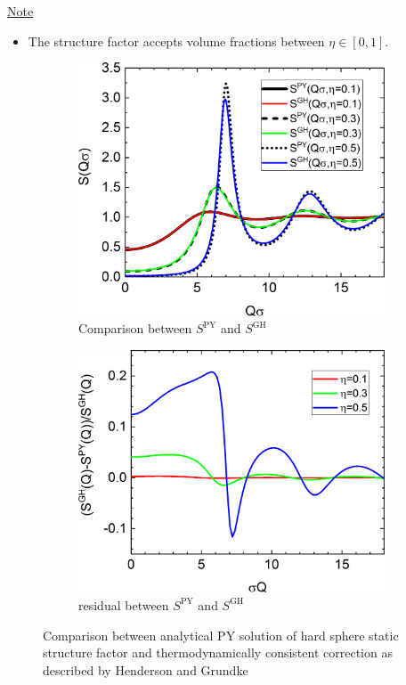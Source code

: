 \noindent
\uline{Note}
\begin{itemize}
\item The structure factor accepts volume fractions between $\eta \in [0,1]$.
\end{itemize}

\begin{figure}[htb]
\begin{subfigure}[b]{.48\textwidth}
   \centering
   \includegraphics[width=1\textwidth]{../images/structure_factor/HardSphere/SQGH.png}
   \caption{Comparison between $S^\mathrm{PY}$ and $S^\mathrm{GH}$}
   \label{fig:SQ:GH_1}
\end{subfigure}
\hfill
\begin{subfigure}[b]{.48\textwidth}
   \centering
   \includegraphics[width=1\textwidth]{../images/structure_factor/HardSphere/ResGH.png}
   \caption{residual between $S^\mathrm{PY}$ and $S^\mathrm{GH}$}
   \label{fig:SQ:GH_2}
\end{subfigure}
\caption{Comparison between analytical PY solution of hard sphere static structure factor and thermodynamically consistent correction as described by Henderson and Grundke}
\label{fig:SQ:GH}
\end{figure}

